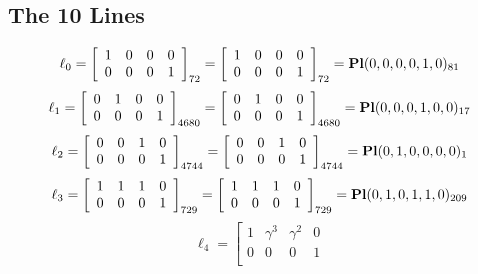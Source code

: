 \documentclass{article}
\begin{document}
{\subsection*{The 10 Lines}
$$
\ell_{0} = 
\left[
\begin{array}{*{4}{r}}
1 & 0 & 0 & 0\\
0 & 0 & 0 & 1\\
\end{array}
\right]
_{72}
=
\left[
\begin{array}{*{4}c}
1  & 0  & 0  & 0\\
0  & 0  & 0  & 1\\
\end{array}
\right]_{72}
={\rm\bf Pl}(0,0,0,0,1,0 )_{81}$$
$$
\ell_{1} = 
\left[
\begin{array}{*{4}{r}}
0 & 1 & 0 & 0\\
0 & 0 & 0 & 1\\
\end{array}
\right]
_{4680}
=
\left[
\begin{array}{*{4}c}
0  & 1  & 0  & 0\\
0  & 0  & 0  & 1\\
\end{array}
\right]_{4680}
={\rm\bf Pl}(0,0,0,1,0,0 )_{17}$$
$$
\ell_{2} = 
\left[
\begin{array}{*{4}{r}}
0 & 0 & 1 & 0\\
0 & 0 & 0 & 1\\
\end{array}
\right]
_{4744}
=
\left[
\begin{array}{*{4}c}
0  & 0  & 1  & 0\\
0  & 0  & 0  & 1\\
\end{array}
\right]_{4744}
={\rm\bf Pl}(0,1,0,0,0,0 )_{1}$$
$$
\ell_{3} = 
\left[
\begin{array}{*{4}{r}}
1 & 1 & 1 & 0\\
0 & 0 & 0 & 1\\
\end{array}
\right]
_{729}
=
\left[
\begin{array}{*{4}c}
1  & 1  & 1  & 0\\
0  & 0  & 0  & 1\\
\end{array}
\right]_{729}
={\rm\bf Pl}(0,1,0,1,1,0 )_{209}$$
$$
\ell_{4} = 
\left[
\begin{array}{*{4}{r}}
1 & \gamma^{3} & \gamma^{2} & 0\\
0 & 0 & 0 & 1\\

\end{array}$$}
\end{document}

